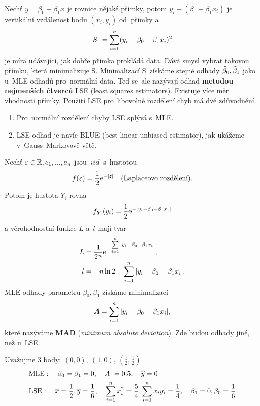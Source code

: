 Nechť $y = \beta_0 + \beta_1 x$ je rovnice nějaké přímky, potom $y_i - (\beta_0 + \beta_1 x_i)$ je vertikální vzdálenost bodu $(x_i,y_i)$ od~přímky a~
 $$
 S~ = \sum\limits_{i=1}^{n} (y_i - \beta_0 - \beta_1 x_i)^2
 $$
je míra udávající, jak dobře přímka prokládá data. Dává smysl vybrat takovou přímku, která minimalizuje S. Minimalizací S~získáme stejné odhady $\widehat{\beta}_0, \widehat{\beta}_1$ jako u~MLE odhadů pro~normální data. Teď se~ale nazývají odhad \textbf{metodou nejmenších čtverců} LSE (least squares estimators).
Existuje více měr vhodnosti přímky. Použití LSE pro~libovolné rozdělení chyb má dvě zdůvodnění.
\begin{enumerate}
  \item Pro~normální rozdělení chyby LSE splývá s~MLE.
  \item LSE odhad je navíc BLUE (best linear unbiased estimator), jak ukážeme v~Gauss–Markovově větě.
\end{enumerate}

\begin{example}
Nechť $\varepsilon\in\mathbb{R},e_1,..., e_n$ jsou $~iid~$ s~hustotou
\begin{equation*}
  f(\varepsilon) = \frac{1}{2} \mathrm{e}^{- | \varepsilon |} \quad (\text{Laplaceovo rozdělení}).
\end{equation*}
Potom je hustota $Y_i$ rovna
\begin{equation*}
  f_{Y_i}(y_i) = \frac{1}{2} \mathrm{e}^{- | y_i - \beta_0 - \beta_1 x_i |}
\end{equation*}
a věrohodnostní funkce $L$ a~$l$ mají tvar
\begin{equation*}
\begin{aligned}
  L & = \frac{1}{2^n} \mathrm{e}^{- \sum\limits_{i=1}^{n} | y_i - \beta_0 - \beta_1 x_i |},  \\
  l & = -n \ln 2 - \sum\limits_{i=1}^{n} | y_i - \beta_0 - \beta_1 x_i | .
\end{aligned}
\end{equation*}
MLE odhady parametrů $\beta_0, \beta_1$ získáme minimalizací
 $$
A = \sum\limits_{i=1}^{n} | y_i - \beta_0 - \beta_1 x_i |,
 $$ které nazýváme \textbf{MAD} (\textit{minimum absolute deviation}). Zde budou odhady jiné, než u~LSE.

Uvažujme 3 body: $(0,0),~ (1,0),~ (\frac{1}{2},\frac{1}{2})$.
 $$
\begin{aligned}
&\mathrm{MLE}: \quad  \beta_0 = \beta_1 = 0, \quad A~ = 0.5
, \quad \widehat{y} = 0 \\
 &\mathrm{LSE}: \quad \overline{x} = \frac{1}{2}, \overline{y} = \frac{1}{6}, \quad \sum\limits_{i=1}^{n} x_i^2 = \frac{5}{4}, \sum\limits_{i=1}^{n} x_i y_i = \frac{1}{4}, \quad \beta_1 = 0, \beta_0 = \frac{1}{6}
  \end{aligned}
 $$
\end{example}

